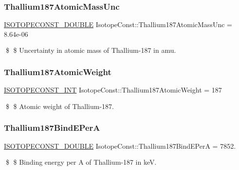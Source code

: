 \subsubsection{\texorpdfstring{Thallium187\+Atomic\+Mass\+Unc}{Thallium187AtomicMassUnc}}
{\footnotesize\ttfamily \mbox{\hyperlink{group___isotope_const-_macros_ga8f45a7272ce02c0b4c65c44636ed719a}{I\+S\+O\+T\+O\+P\+E\+C\+O\+N\+S\+T\+\_\+\+D\+O\+U\+B\+LE}} Isotope\+Const\+::\+Thallium187\+Atomic\+Mass\+Unc = 8.\+64e-\/06}

\$ \$ Uncertainty in atomic mass of Thallium-\/187 in amu. \mbox{\label{group___isotope_const-_thallium-_tl187_ga25de506c0846065d7642b3ab24901345}} 
\subsubsection{\texorpdfstring{Thallium187\+Atomic\+Weight}{Thallium187AtomicWeight}}
{\footnotesize\ttfamily \mbox{\hyperlink{group___isotope_const-_macros_ga5f18360b3e99483a35c32d789e62621c}{I\+S\+O\+T\+O\+P\+E\+C\+O\+N\+S\+T\+\_\+\+I\+NT}} Isotope\+Const\+::\+Thallium187\+Atomic\+Weight = 187}

\$ \$ Atomic weight of Thallium-\/187. \mbox{\label{group___isotope_const-_thallium-_tl187_ga5345a99a3d65c654a973dd0d48a60d9f}} 
\subsubsection{\texorpdfstring{Thallium187\+Bind\+E\+PerA}{Thallium187BindEPerA}}
{\footnotesize\ttfamily \mbox{\hyperlink{group___isotope_const-_macros_ga8f45a7272ce02c0b4c65c44636ed719a}{I\+S\+O\+T\+O\+P\+E\+C\+O\+N\+S\+T\+\_\+\+D\+O\+U\+B\+LE}} Isotope\+Const\+::\+Thallium187\+Bind\+E\+PerA = 7852.}

\$ \$ Binding energy per A of Thallium-\/187 in keV. \mbox{\label{group___isotope_const-_thallium-_tl187_gaebfeca40f663861eeee4c972c2beb805}} 
